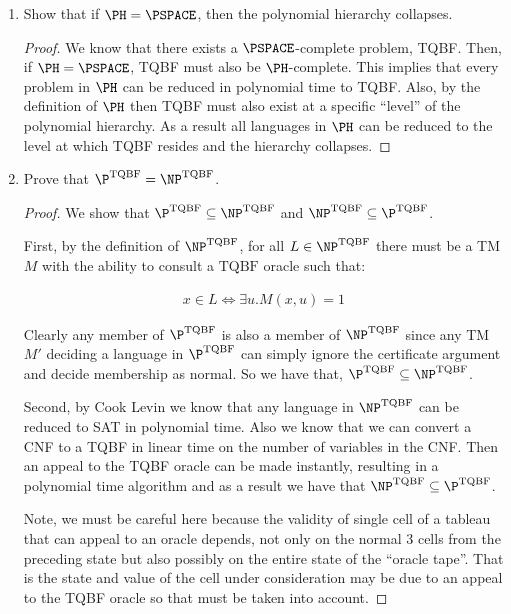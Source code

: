 \documentclass[usletter]{article}
\begin{document}
\begin{enumerate}
    \item Show that if $\PH = \PSPACE$, then the polynomial hierarchy collapses.

      \begin{proof}
        We know that there exists a $\PSPACE$-complete problem, TQBF. Then, if $\PH = \PSPACE$, TQBF must also be $\PH$-complete. This implies that every problem in $\PH$ can be reduced in polynomial time to TQBF. Also, by the definition of $\PH$ then TQBF must also exist at a specific ``level'' of the polynomial hierarchy. As a result all languages in $\PH$ can be reduced to the level at which TQBF resides and the hierarchy collapses.
      \end{proof}

    \item Prove that $\P^{\text{TQBF}} = \NP^{\text{TQBF}}$.

      \begin{proof}
        We show that $\P^{\text{TQBF}} \subseteq \NP^{\text{TQBF}}$ and $\NP^{\text{TQBF}} \subseteq \P^{\text{TQBF}}$.

        First, by the definition of $\NP^{\text{TQBF}}$, for all $L \in \NP^{\text{TQBF}}$ there must be a TM $M$ with the ability to consult a $\text{TQBF}$ oracle such that:

      \begin{align}
        x \in L \iff \exists u.M(x,u) = 1
      \end{align}

      Clearly any member of $\P^{\text{TQBF}}$ is also a member of $\NP^{\text{TQBF}}$ since any TM $M'$ deciding a language in $\P^{\text{TQBF}}$ can simply ignore the certificate argument and decide membership as normal. So we have that, $\P^{\text{TQBF}} \subseteq \NP^{\text{TQBF}}$.

      Second, by Cook Levin we know that any language in $\NP^{\text{TQBF}}$ can be reduced to SAT in polynomial time. Also we know that we can convert a CNF to a TQBF in linear time on the number of variables in the CNF. Then an appeal to the TQBF oracle can be made instantly, resulting in a polynomial time algorithm and as a result we have that $\NP^{\text{TQBF}} \subseteq \P^{\text{TQBF}}$.

      Note, we must be careful here because the validity of single cell of a tableau that can appeal to an oracle depends, not only on the normal 3 cells from the preceding state but also possibly on the entire state of the ``oracle tape''. That is the state and value of the cell under consideration may be due to an appeal to the TQBF oracle so that must be taken into account.


\end{proof}
\end{enumerate}
\end{document}
